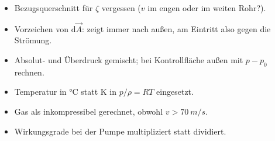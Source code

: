 \documentclass[11pt,a4paper]{article}
\newcommand{\dd}{\mathrm{d}}
\begin{document}
\begin{merke}
\begin{itemize}[leftmargin=*]
\item Bezugsquerschnitt für $\zeta$ vergessen ($v$ im engen oder im weiten Rohr?).
\item Vorzeichen von $\dd\vec A$: zeigt immer nach außen, am Eintritt also gegen die Strömung.
\item Absolut- und Überdruck gemischt; bei Kontrollfläche außen mit $p - p_0$ rechnen.
\item Temperatur in °C statt K in $p/\rho = RT$ eingesetzt.
\item Gas als inkompressibel gerechnet, obwohl $v > \SI{70}{m/s}$.
\item Wirkungsgrade bei der Pumpe multipliziert statt dividiert.
\end{itemize}
\end{merke}
\end{document}
